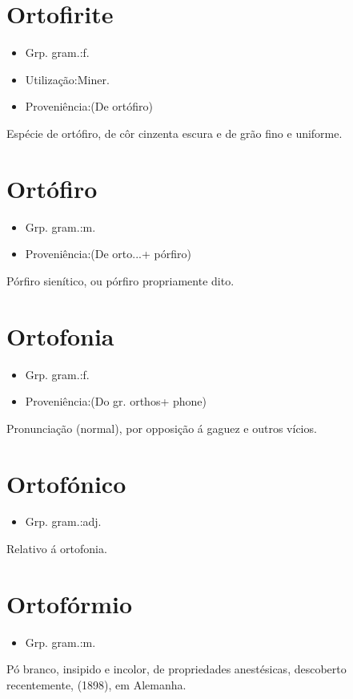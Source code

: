 \section{Ortofirite}
\begin{itemize}
\item {Grp. gram.:f.}
\end{itemize}
\begin{itemize}
\item {Utilização:Miner.}
\end{itemize}
\begin{itemize}
\item {Proveniência:(De \textunderscore ortófiro\textunderscore )}
\end{itemize}
Espécie de ortófiro, de côr cinzenta escura e de grão fino e uniforme.
\section{Ortófiro}
\begin{itemize}
\item {Grp. gram.:m.}
\end{itemize}
\begin{itemize}
\item {Proveniência:(De \textunderscore orto...\textunderscore  + \textunderscore pórfiro\textunderscore )}
\end{itemize}
Pórfiro sienítico, ou pórfiro propriamente dito.
\section{Ortofonia}
\begin{itemize}
\item {Grp. gram.:f.}
\end{itemize}
\begin{itemize}
\item {Proveniência:(Do gr. \textunderscore orthos\textunderscore  + \textunderscore phone\textunderscore )}
\end{itemize}
Pronunciação (normal), por opposição á gaguez e outros vícios.
\section{Ortofónico}
\begin{itemize}
\item {Grp. gram.:adj.}
\end{itemize}
Relativo á ortofonia.
\section{Ortofórmio}
\begin{itemize}
\item {Grp. gram.:m.}
\end{itemize}
Pó branco, insipido e incolor, de propriedades anestésicas, descoberto recentemente, (1898), em Alemanha.
